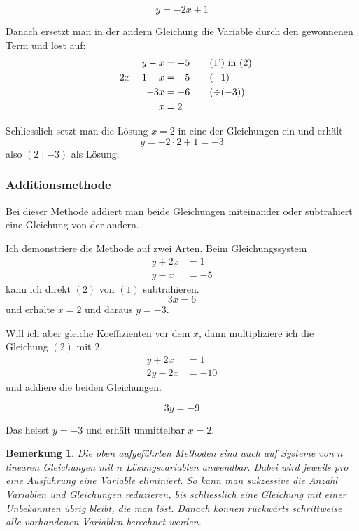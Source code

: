 \documentclass[%
11pt,%
twoside,%
titlepage,%
swissgerman,%
headsepline%
]{scrartcl}
\theoremstyle{definition}
\newtheorem{bem}{Bemerkung}[subsection] %
\theoremstyle{plain}
\newtheorem{bem}{Bemerkung}[subsection] %
\theoremstyle{plain}
\begin{document}
	\begin{equation}
		y=-2x+1\tag{1'}
	\end{equation}
	
	Danach ersetzt man in der andern Gleichung die Variable durch den gewonnenen Term und löst auf:
	\begin{align}
		y-x&=-5\tag{1') in (2}\\
		-2x+1-x&=-5\tag{$-1$}\\
		-3x&=-6\tag{$\div(-3)$}\\
		x&=2\notag
	\end{align}
	
	Schliesslich setzt man die Lösung $x=2$ in eine der Gleichungen ein und erhält
	$$y=-2\cdot 2+1=-3$$
	also $(2\mid -3)$ als Lösung.
	
	\subsubsection{Additionsmethode}
	Bei dieser Methode addiert man beide Gleichungen miteinander oder subtrahiert eine Gleichung von der andern.
	
	Ich demonstriere die Methode auf zwei Arten. Beim Gleichungssystem
	\begin{align}
		y+2x&=1\tag{1}\\
		y-x&=-5\tag{2}
	\end{align}
	kann ich direkt $(2)$ von $(1)$ subtrahieren.
	\begin{equation}
		3x=6\tag{$2)-(1$}
	\end{equation}
	und erhalte $x=2$ und daraus $y=-3$.
	
	Will ich aber gleiche Koeffizienten vor dem $x$, dann multipliziere ich die Gleichung $(2)$ mit $2$.
	\begin{align}
		y+2x&=1\tag{1}\\
		2y-2x&=-10\tag{$2\cdot(2)$}
	\end{align}
	und addiere die beiden Gleichungen.
	
	\begin{equation}
		3y=-9\tag{$1)+(2$}
	\end{equation}
	
	Das heisst $y=-3$ und erhält unmittelbar $x=2$.
	
	\begin{bem}
		Die oben aufgeführten Methoden sind auch auf Systeme von $n$ linearen Gleichungen mit $n$ Lösungsvariablen anwendbar. Dabei wird jeweils pro eine Ausführung eine Variable eliminiert. So kann man sukzessive die Anzahl Variablen und Gleichungen reduzieren, bis schliesslich eine Gleichung mit einer Unbekannten übrig bleibt, die man löst. Danach können rückwärts schrittweise alle vorhandenen Variablen berechnet werden.
	\end{bem}
	
\end{document}

